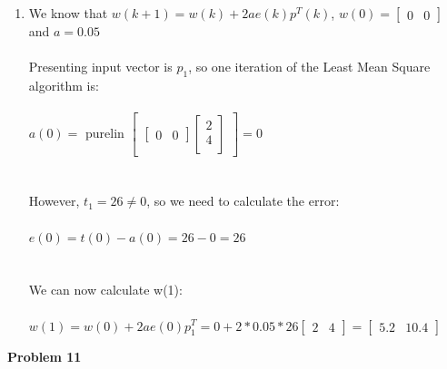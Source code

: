 \documentclass{article}
\begin{document}
\begin{enumerate}[label=\Alph*]
  \item We know that $w(k+1) = w(k) + 2ae(k)p^T(k)$, $w(0) = 
    \begin{bmatrix}
      0 & 0
    \end{bmatrix}$ and $a = 0.05$ \\ \\ Presenting input vector is $p_1$, so one iteration of the Least Mean Square algorithm is: \\ \\
    $a(0) =$ purelin $
    \begin{bmatrix}
      \begin{bmatrix}
        0 & 0
      \end{bmatrix}
      \begin{bmatrix}
        2 \\
        4 \\
      \end{bmatrix}
    \end{bmatrix} = 0$ \\ \\ \\However, $t_1 = 26 \neq 0$, so we need to calculate the error: \\ \\
    $e(0) = t(0) - a(0) = 26 - 0 = 26$ \\ \\ \\ We can now calculate w(1): \\ \\ $w(1) = w(0) +2ae(0)p_1^T = 0 + 2 * 0.05 * 26
    \begin{bmatrix}
      2 & 4
    \end{bmatrix} = 
    \begin{bmatrix}
      5.2 & 10.4
    \end{bmatrix}$
    
  
\end{enumerate}




\newpage
\noindent \textbf{Problem 11}
\end{document}
